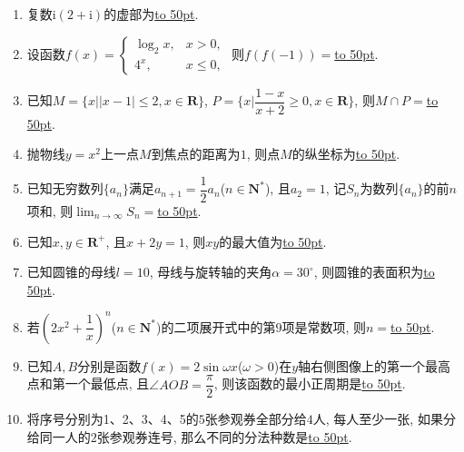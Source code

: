 \documentclass[10pt,a4paper]{article}
\newcommand{\blank}[1]{\underline{\hbox to #1pt{}}}
\begin{document}
\begin{enumerate}[1.]
\item 复数$\mathrm{i}(2+\mathrm{i})$的虚部为\blank{50}.
\item 设函数$f(x)=\begin{cases}\log_2 x, & x>0, \\ 4^x, & x\le 0,\end{cases}$ 则$f(f(-1))=$\blank{50}.
\item 已知$M=\{x||x-1|\le 2,x\in \mathbf{R}\}$, $P=\{x|\dfrac{1-x}{x+2}\ge 0,x\in \mathbf{R}\}$, 则$M\cap P=$\blank{50}.
\item 抛物线$y=x^2$上一点$M$到焦点的距离为$1$, 则点$M$的纵坐标为\blank{50}.
\item 已知无穷数列$\{a_n\}$满足$a_{n+1}=\dfrac12{a_n}$($n\in \mathbf{N}^*$), 且$a_2=1$, 记$S_n$为数列$\{a_n\}$的前$n$项和, 则$\displaystyle\lim_{n\to \infty}S_n=$\blank{50}.
\item 已知$x,y\in \mathbf{R}^+$, 且$x+2y=1$, 则$xy$的最大值为\blank{50}.
\item 已知圆锥的母线$l=10$, 母线与旋转轴的夹角$\alpha =30^\circ$, 则圆锥的表面积为\blank{50}.
\item 若$(2x^2+\dfrac1x)^n$($n\in \mathbf{N}^*$)的二项展开式中的第$9$项是常数项, 则$n=$\blank{50}.
\item 已知$A,B$分别是函数$f(x)=2\sin \omega x$($\omega >0$)在$y$轴右侧图像上的第一个最高点和第一个最低点, 且$\angle AOB=\dfrac\pi 2$, 则该函数的最小正周期是\blank{50}.
\item 将序号分别为1、2、3、4、5的$5$张参观券全部分给$4$人, 每人至少一张, 如果分给同一人的$2$张参观券连号, 那么不同的分法种数是\blank{50}.



\end{enumerate}
\end{document}

